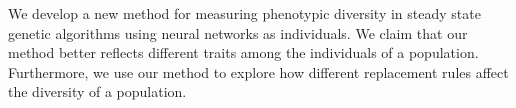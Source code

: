 We develop a new method for measuring phenotypic diversity in steady state genetic algorithms using neural networks as individuals. We claim that our method better reflects different traits among the individuals of a population. Furthermore, we use our method to explore how different replacement rules affect the diversity of a population.

